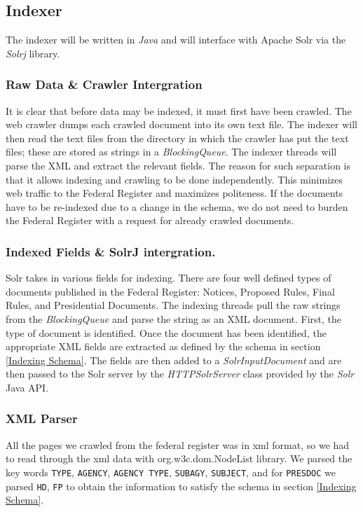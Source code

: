 \documentclass{sig-alternate-05-2015}
\begin{document}
\subsection{Indexer}
The indexer will be written in \emph{Java} and will interface with Apache Solr via the \emph{Solrj} library.
\subsubsection{Raw Data \& Crawler Intergration}
It is clear that before data may be indexed, it must first have been crawled. The web crawler dumps each crawled document into its own text file. The indexer will then read the text files from the directory in which the crawler has put the text files; these are stored as strings in a \emph{BlockingQueue}. The indexer threads will parse the XML and extract the relevant fields. The reason for such separation is that it allows indexing and crawling to be done independently. This  minimizes web traffic to the Federal Register and maximizes politeness. If the documents have to be re-indexed due to a change in the schema, we do not need to burden the Federal Register with a request for already crawled documents.

\subsubsection{Indexed Fields \& SolrJ intergration.}
Solr takes in various fields for indexing. There are four well defined types of documents published in the Federal Register: Notices, Proposed Rules, Final Rules, and Presidential Documents. The indexing threads pull the raw strings from the \emph{BlockingQueue} and parse the string as an XML document. First, the type of document is identified. Once the document has been identified, the appropriate XML fields are extracted as defined by the schema in section \ref{Indexing Schema}. The fields are then added to a \emph{SolrInputDocument} and are then passed to the Solr server by the \emph{HTTPSolrServer} class provided by the \emph{Solr} Java API.

\subsubsection{XML Parser}
All the pages we crawled from the federal register was in xml format, so we had to read through the xml data with org.w3c.dom.NodeList library. We parsed the key words \texttt{TYPE}, \texttt{AGENCY}, \texttt{AGENCY TYPE}, \texttt{SUBAGY}, \texttt{SUBJECT}, and for \texttt{PRESDOC} we parsed \texttt{HD}, \texttt{FP} to obtain the information to satisfy the schema in section \ref{Indexing Schema}.\\
\end{document}
